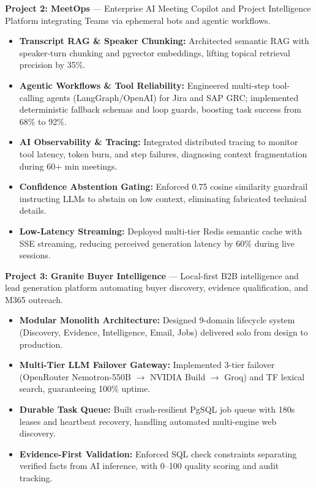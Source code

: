 \documentclass[a4paper,10pt]{article}
\begin{document}
\noindent
\textbf{\color{projecttitle}Project 2: MeetOps} --- Enterprise AI Meeting Copilot and Project Intelligence Platform integrating Teams via ephemeral bots and agentic workflows.
\begin{itemize}
    \item \textbf{Transcript RAG \& Speaker Chunking:} Architected semantic RAG with speaker-turn chunking and pgvector embeddings, lifting topical retrieval precision by 35\%.
    \item \textbf{Agentic Workflows \& Tool Reliability:} Engineered multi-step tool-calling agents (LangGraph/OpenAI) for Jira and SAP GRC; implemented deterministic fallback schemas and loop guards, boosting task success from 68\% to 92\%.
    \item \textbf{AI Observability \& Tracing:} Integrated distributed tracing to monitor tool latency, token burn, and step failures, diagnosing context fragmentation during 60+ min meetings.
    \item \textbf{Confidence Abstention Gating:} Enforced 0.75 cosine similarity guardrail instructing LLMs to abstain on low context, eliminating fabricated technical details.
    \item \textbf{Low-Latency Streaming:} Deployed multi-tier Redis semantic cache with SSE streaming, reducing perceived generation latency by 60\% during live sessions.
\end{itemize}

\vspace{5pt}

\noindent
\textbf{\color{projecttitle}Project 3: Granite Buyer Intelligence} --- Local-first B2B intelligence and lead generation platform automating buyer discovery, evidence qualification, and M365 outreach.
\begin{itemize}
    \item \textbf{Modular Monolith Architecture:} Designed 9-domain lifecycle system (Discovery, Evidence, Intelligence, Email, Jobs) delivered solo from design to production.
    \item \textbf{Multi-Tier LLM Failover Gateway:} Implemented 3-tier failover (OpenRouter Nemotron-550B $\rightarrow$ NVIDIA Build $\rightarrow$ Groq) and TF lexical search, guaranteeing 100\% uptime.
    \item \textbf{Durable Task Queue:} Built crash-resilient PgSQL job queue with 180s leases and heartbeat recovery, handling automated multi-engine web discovery.
    \item \textbf{Evidence-First Validation:} Enforced SQL check constraints separating verified facts from AI inference, with 0--100 quality scoring and audit tracking.
\end{itemize}
\end{document}
